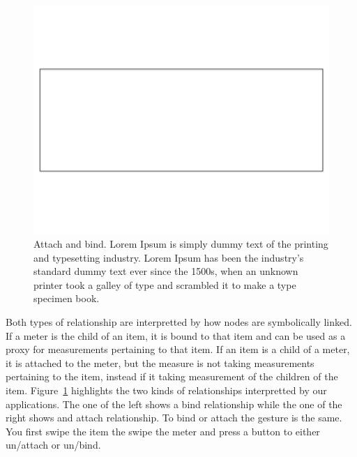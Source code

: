 \begin{figure}[htb!]
\begin{center}
\includegraphics[scale=0.3]{figs/blankrectangle}
\caption{Attach and bind. Lorem Ipsum is simply dummy text of the printing and typesetting industry. Lorem Ipsum has 
been the industry's standard dummy text ever since the 1500s, when an unknown printer took a galley of 
type and scrambled it to make a type specimen book.  }
\label{fig:attachandbind}
\end{center}
\end{figure}

Both types of relationship are interpretted by how nodes are symbolically linked.  If a meter is the child
of an item, it is bound to that item and can be used as a proxy for measurements pertaining to that item.
If an item is a child of a meter, it is attached to the meter, but the measure is not taking measurements
pertaining to the item, instead if it taking measurement of the children of the item.  Figure~\ref{fig:attachandbind}
highlights the two kinds of relationships interpretted by our applications.  The one of the left shows
a bind relationship while the one of the right shows and attach relationship.
To bind or attach the gesture is the same.  You first swipe the item the swipe the meter and press a button to either
un/attach or un/bind.

